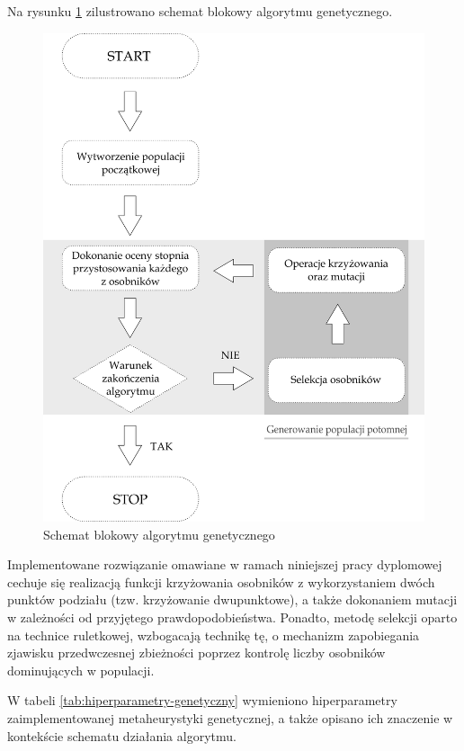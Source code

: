 Na rysunku \ref{fig:algorytm-genetyczny} zilustrowano schemat blokowy algorytmu genetycznego.

\begin{figure}[ht]
    \centering
     \includegraphics[width=0.6\linewidth]{rys04/algorytm-genetyczny.png}
    \caption{Schemat blokowy algorytmu genetycznego}
    \label{fig:algorytm-genetyczny}
\end{figure}

Implementowane rozwiązanie omawiane w ramach niniejszej pracy dyplomowej cechuje się realizacją funkcji krzyżowania osobników z wykorzystaniem dwóch punktów podziału (tzw. krzyżowanie dwupunktowe), a także dokonaniem mutacji w zależności od przyjętego prawdopodobieństwa. Ponadto, metodę selekcji oparto na technice ruletkowej, wzbogacają technikę tę, o mechanizm zapobiegania zjawisku przedwczesnej zbieżności poprzez kontrolę liczby osobników dominujących w populacji.

W tabeli \ref{tab:hiperparametry-genetyczny} wymieniono hiperparametry zaimplementowanej metaheurystyki genetycznej, a także opisano ich znaczenie w kontekście schematu działania algorytmu.

